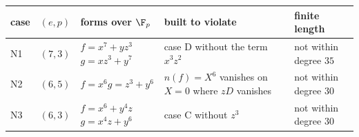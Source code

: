 \begin{tabular}{@{}ll>{\raggedright\arraybackslash}p{4.6cm}>{\raggedright\arraybackslash}p{4.2cm}l@{}}
\toprule
case & $(e,p)$ & forms over $\F_p$ & built to violate & finite length\\
\midrule
N1 & $(7,3)$ & $f=x^{7} + yz^{3}$\newline $g=xz^{3} + y^{7}$ & case D without the term $x^3z^2$ & not within degree $35$\\
N2 & $(6,5)$ & $f=x^{6}$\newline $g=z^{3} + y^{6}$ & $n(f)=X^6$ vanishes on $X=0$ where $zD$ vanishes & not within degree $30$\\
N3 & $(6,3)$ & $f=x^{6} + y^{4}z$\newline $g=x^{4}z + y^{6}$ & case C without $z^3$ & not within degree $30$\\
\bottomrule
\end{tabular}
